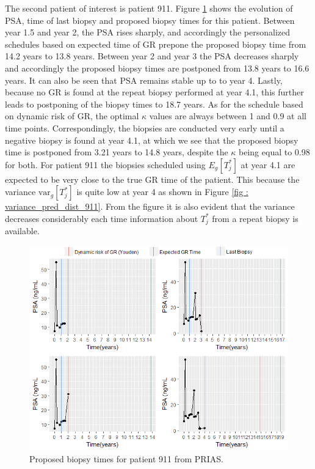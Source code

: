 The second patient of interest is patient 911. Figure \ref{fig : prias_demo_pid_911} shows the evolution of PSA, time of last biopsy and proposed biopsy times for this patient. Between year 1.5 and year 2, the PSA rises sharply, and accordingly the personalized schedules based on expected time of GR prepone the proposed biopsy time from 14.2 years to 13.8 years. Between year 2 and year 3 the PSA decreases sharply and accordingly the proposed biopsy times are postponed from 13.8 years to 16.6 years. It can also be seen that PSA remains stable up to to year 4. Lastly, because no GR is found at the repeat biopsy performed at year 4.1, this further leads to postponing of the biopsy times to 18.7 years. As for the schedule based on dynamic risk of GR, the optimal $\kappa$ values are always between 1 and 0.9 at all time points. Correspondingly, the biopsies are conducted very early until a negative biopsy is found at year 4.1, at which we see that the proposed biopsy time is postponed from 3.21 years to 14.8 years, despite the $\kappa$ being equal to 0.98 for both. For patient 911 the biopsies scheduled using $E_g[T^*_j]$ at year 4.1 are expected to be very close to the true GR time of the patient. This because the variance $\mbox{var}_g[T^*_j]$ is quite low at year 4 as shown in Figure \ref{fig : variance_pred_dist_911}. From the figure it is also evident that the variance decreases considerably each time information about $T^*_j$ from a repeat biopsy is available.\\

\begin{figure}[!htb]
\centering
\captionsetup{justification=centering}
\includegraphics[width=\textwidth]{images/prias_demo/case_911.png}
\caption{\label{fig : prias_demo_pid_911} Proposed biopsy times for patient 911 from PRIAS.}
\end{figure}

